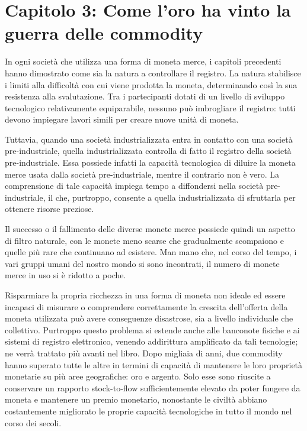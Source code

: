 \documentclass[
  a5paper,
  smalldemyvopaper,10pt,twoside,onecolumn,openright,extrafontsizes,hidelinks]{memoir}
\begin{document}

\chapter{\texorpdfstring{Capitolo 3: \textbf{Come l'oro ha vinto la
guerra delle
commodity}}{Capitolo 3: Come l'oro ha vinto la guerra delle commodity}}\label{capitolo-3-come-loro-ha-vinto-la-guerra-delle-commodity}

In ogni società che utilizza una forma di moneta merce, i capitoli
precedenti hanno dimostrato come sia la natura a controllare il
registro. La natura stabilisce i limiti alla difficoltà con cui viene
prodotta la moneta, determinando così la sua resistenza alla
svalutazione. Tra i partecipanti dotati di un livello di sviluppo
tecnologico relativamente equiparabile, nessuno può imbrogliare il
registro: tutti devono impiegare lavori simili per creare nuove unità di
moneta.

Tuttavia, quando una società industrializzata entra in contatto con una
società pre-industriale, quella industrializzata controlla di fatto il
registro della società pre-industriale. Essa possiede infatti la
capacità tecnologica di diluire la moneta merce usata dalla società
pre-industriale, mentre il contrario non è vero. La comprensione di tale
capacità impiega tempo a diffondersi nella società pre-industriale, il
che, purtroppo, consente a quella industrializzata di sfruttarla per
ottenere risorse preziose.

Il successo o il fallimento delle diverse monete merce possiede quindi
un aspetto di filtro naturale, con le monete meno scarse che
gradualmente scompaiono e quelle più rare che continuano ad esistere.
Man mano che, nel corso del tempo, i vari gruppi umani del nostro mondo
si sono incontrati, il numero di monete merce in uso si è ridotto a
poche.

Risparmiare la propria ricchezza in una forma di moneta non ideale ed
essere incapaci di misurare o comprendere correttamente la crescita
dell'offerta della moneta utilizzata può avere conseguenze disastrose,
sia a livello individuale che collettivo. Purtroppo questo problema si
estende anche alle banconote fisiche e ai sistemi di registro
elettronico, venendo addirittura amplificato da tali tecnologie; ne
verrà trattato più avanti nel libro. Dopo migliaia di anni, due
commodity hanno superato tutte le altre in termini di capacità di
mantenere le loro proprietà monetarie su più aree geografiche: oro e
argento. Solo esse sono riuscite a conservare un rapporto stock-to-flow
sufficientemente elevato da poter fungere da moneta e mantenere un
premio monetario, nonostante le civiltà abbiano costantemente migliorato
le proprie capacità tecnologiche in tutto il mondo nel corso dei secoli.
\end{document}
